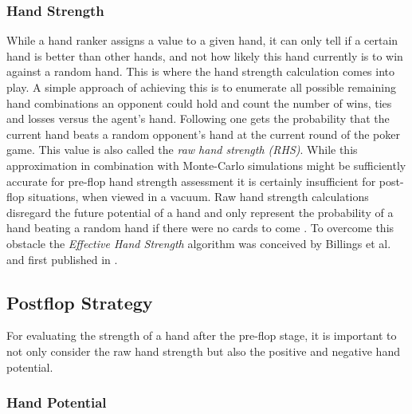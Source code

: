 \subsubsection{Hand Strength}
While a hand ranker assigns a value to a given hand, it can only tell if a certain hand is better than other hands, and not how likely this hand currently is to win against a random hand. This is where the hand strength calculation comes into play. A simple approach of achieving this is to enumerate all possible remaining hand combinations an opponent could hold and count the number of wins, ties and losses versus the agent's hand. Following  one gets the probability that the current hand beats a random opponent's hand at the current round of the poker game. This value is also called the \textit{raw hand strength (RHS)}. While this approximation in combination with Monte-Carlo simulations might be sufficiently accurate for pre-flop hand strength assessment it is certainly insufficient for post-flop situations, when viewed in a vacuum. Raw hand strength calculations disregard the future potential of a hand and only represent the probability of a hand beating a random hand if there were no cards to come \cite{opp_master}. To overcome this obstacle the \textit{Effective Hand Strength} algorithm was conceived by Billings et al. and first published in \cite{opp_modeling}.
\subsection{Postflop Strategy}
For evaluating the strength of a hand after the pre-flop stage, it is important to not only consider the raw hand strength but also the positive and negative hand potential.
\subsubsection{Hand Potential}
